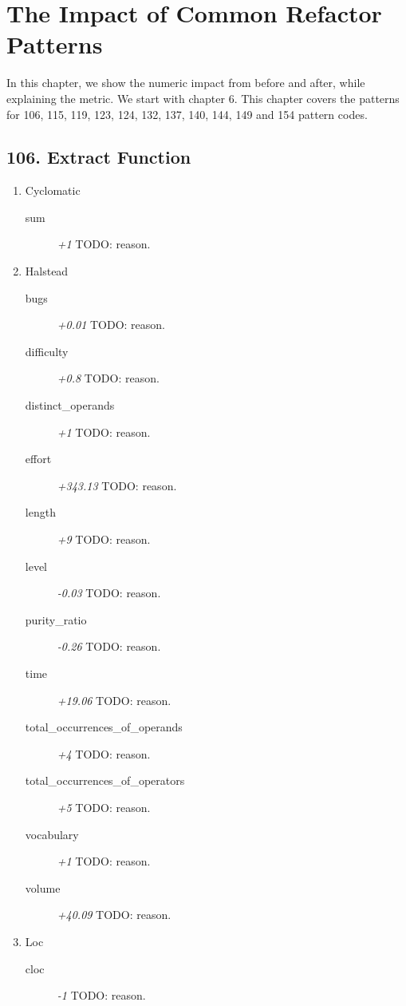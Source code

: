 \section{The Impact of Common Refactor Patterns}

In this chapter, we show the numeric impact from before and after, while explaining the metric. We start with chapter 6.
This chapter covers the patterns for 106, 115, 119, 123, 124, 132, 137, 140, 144, 149 and 154 pattern codes.

\subsection{106. Extract Function}

\begin{enumerate}
  \item Cyclomatic
        \begin{description}
          \item [sum] \textit{+1} TODO: reason.
        \end{description}
  \item Halstead
        \begin{description}
          \item [bugs] \textit{+0.01} TODO: reason.
          \item [difficulty] \textit{+0.8} TODO: reason.
          \item [distinct\_operands] \textit{+1} TODO: reason.
          \item [effort] \textit{+343.13} TODO: reason.
          \item [length] \textit{+9} TODO: reason.
          \item [level] \textit{-0.03} TODO: reason.
          \item [purity\_ratio] \textit{-0.26} TODO: reason.
          \item [time] \textit{+19.06} TODO: reason.
          \item [total\_occurrences\_of\_operands] \textit{+4} TODO: reason.
          \item [total\_occurrences\_of\_operators] \textit{+5} TODO: reason.
          \item [vocabulary] \textit{+1} TODO: reason.
          \item [volume] \textit{+40.09} TODO: reason.
        \end{description}
  \item Loc
        \begin{description}
          \item [cloc] \textit{-1} TODO: reason.

\end{description}
\end{enumerate}
